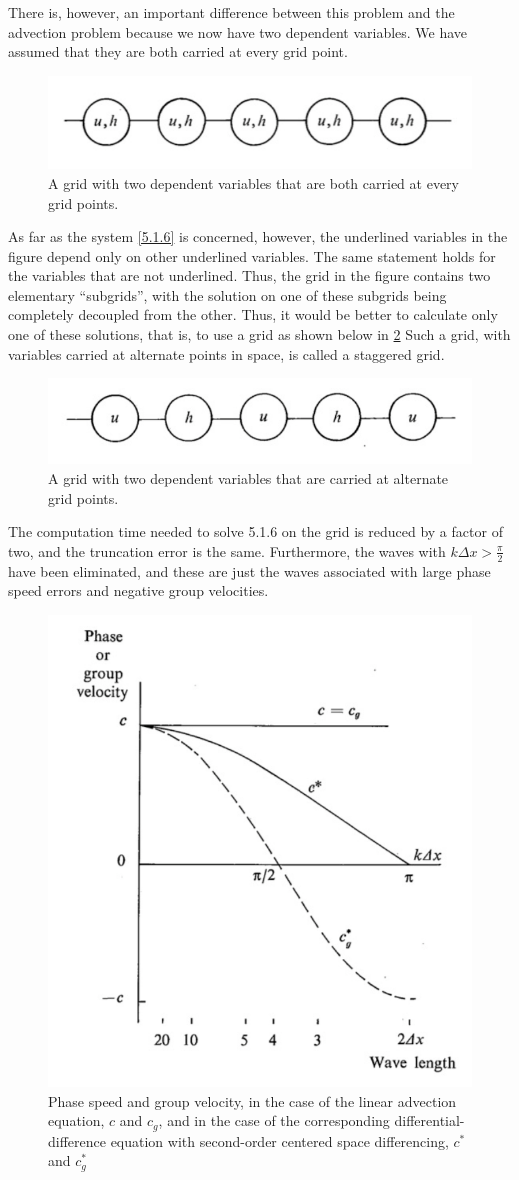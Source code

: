 There is, however, an important difference between this problem and the advection problem because we now have two dependent variables. We have assumed that they are both carried at every grid point.\begin{figure}[h]
    \centering
    \includegraphics[width=0.5\linewidth]{uploads/Screenshot 2024-11-13 180623.png}
    \caption{A grid with two dependent variables that are both carried at every grid points.}
    \label{fig:5.1.3}
\end{figure}
As far as the system \ref{5.1.6} is concerned, however, the underlined variables in the figure depend only on other underlined variables. The same statement holds for the variables that are not underlined. Thus, the grid in the figure contains two elementary “subgrids”, with the solution on one of these subgrids being completely decoupled from the other. Thus, it would be better to calculate only one of these solutions, that is, to use a grid as shown below in \ref{fig:5.1.4} Such a grid, with variables carried at alternate points in space, is called a staggered grid.
\begin{figure}[h]
    \centering
    \includegraphics[width=0.5\linewidth]{uploads/Screenshot 2024-11-13 180824.png}
    \caption{A grid with two dependent variables that are carried at alternate grid points.}
    \label{fig:5.1.4}
\end{figure}
The computation time needed to solve 5.1.6 on the grid is reduced by a factor of two, and the truncation error is the same. Furthermore, the waves with $k\Delta x>\frac{\pi}{2}$ have been eliminated, and these are just the waves associated with large phase speed errors and negative group velocities. 
\begin{figure}[h!]
    \centering
    \includegraphics[width=0.45\linewidth]{uploads/Screenshot 2024-11-14 112837.png}
    \caption{Phase speed and group velocity, in the case of the linear advection equation, $c$ and $c_g$, and in the case of the corresponding differential-difference equation with second-order centered space differencing, $c^*$ and $c^*_g$}
    \label{fig:4.2.2}
\end{figure}


